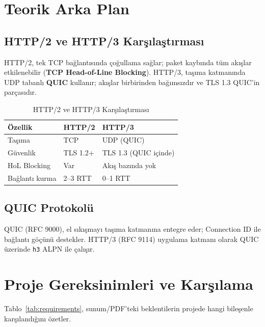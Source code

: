 \documentclass[12pt,a4paper]{article}
\begin{document}
\section{Teorik Arka Plan}

\subsection{HTTP/2 ve HTTP/3 Karşılaştırması}

HTTP/2, tek TCP bağlantısında çoğullama sağlar; paket kaybında tüm
akışlar etkilenebilir (\textbf{TCP Head-of-Line Blocking}). HTTP/3,
taşıma katmanında UDP tabanlı \textbf{QUIC} kullanır; akışlar birbirinden
bağımsızdır ve TLS 1.3 QUIC'in parçasıdır.

\begin{table}[H]
  \centering
  \caption{HTTP/2 ve HTTP/3 Karşılaştırması}
  \begin{tabular}{lll}
    \toprule
    \textbf{Özellik} & \textbf{HTTP/2} & \textbf{HTTP/3} \\
    \midrule
    Taşıma & TCP & UDP (QUIC) \\
    Güvenlik & TLS 1.2+ & TLS 1.3 (QUIC içinde) \\
    HoL Blocking & Var & Akış bazında yok \\
    Bağlantı kurma & 2--3 RTT & 0--1 RTT \\
  \bottomrule
  \end{tabular}
\end{table}

\subsection{QUIC Protokolü}

QUIC (RFC 9000), el sıkışmayı taşıma katmanına entegre eder; Connection ID
ile bağlantı göçünü destekler. HTTP/3 (RFC 9114) uygulama katmanı olarak
QUIC üzerinde \texttt{h3} ALPN ile çalışır.

\section{Proje Gereksinimleri ve Karşılama}

Tablo~\ref{tab:requirements}, sunum/PDF'teki beklentilerin projede hangi
bileşenle karşılandığını özetler.
\end{document}
